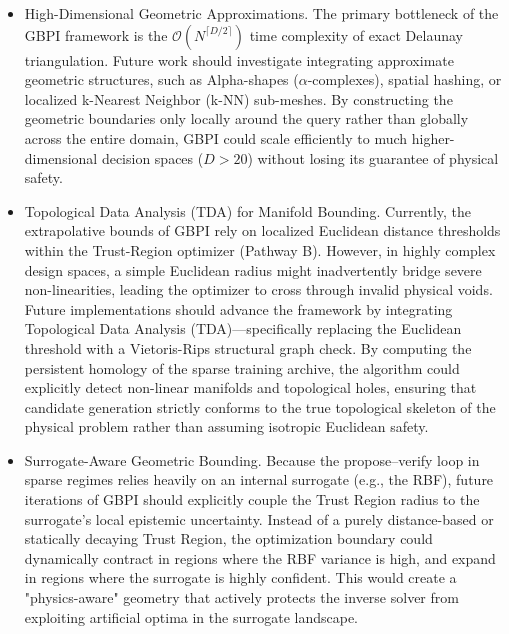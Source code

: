 \begin{itemize}
  \item High-Dimensional Geometric Approximations.
  The primary bottleneck of the GBPI framework is the $\mathcal{O}(N^{\lceil D/2 \rceil})$ time complexity of exact Delaunay triangulation. Future work should investigate integrating approximate geometric structures, such as Alpha-shapes ($\alpha$-complexes), spatial hashing, or localized k-Nearest Neighbor (k-NN) sub-meshes. By constructing the geometric boundaries only locally around the query rather than globally across the entire domain, GBPI could scale efficiently to much higher-dimensional decision spaces ($D > 20$) without losing its guarantee of physical safety.


 \item Topological Data Analysis (TDA) for Manifold Bounding.
  Currently, the extrapolative bounds of GBPI rely on localized Euclidean distance thresholds within the Trust-Region optimizer (Pathway B). However, in highly complex design spaces, a simple Euclidean radius might inadvertently bridge severe non-linearities, leading the optimizer to cross through invalid physical voids. Future implementations should advance the framework by integrating Topological Data Analysis (TDA)—specifically replacing the Euclidean threshold with a Vietoris-Rips structural graph check. By computing the persistent homology of the sparse training archive, the algorithm could explicitly detect non-linear manifolds and topological holes, ensuring that candidate generation strictly conforms to the true topological skeleton of the physical problem rather than assuming isotropic Euclidean safety.

  
  \item Surrogate-Aware Geometric Bounding.
  Because the propose--verify loop in sparse regimes relies heavily on an internal surrogate (e.g., the RBF), future iterations of GBPI should explicitly couple the Trust Region radius to the surrogate's local epistemic uncertainty. Instead of a purely distance-based or statically decaying Trust Region, the optimization boundary could dynamically contract in regions where the RBF variance is high, and expand in regions where the surrogate is highly confident. This would create a "physics-aware" geometry that actively protects the inverse solver from exploiting artificial optima in the surrogate landscape.
\end{itemize}

